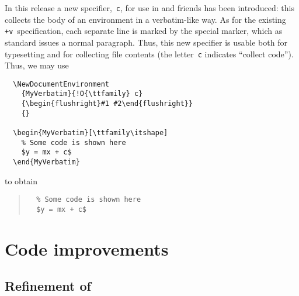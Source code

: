\documentclass{ltnews}
\begin{document}
In this release a new specifier,~\texttt{c},
for use
in  and friends
has been introduced: 
this collects the body of an environment in a verbatim-like way. 
As for the
existing \texttt{+v}~specification, each separate line is marked by
the special  marker, which as standard issues a normal
paragraph. Thus, this new specifier is usable both for typesetting and
for collecting file contents (the letter~\texttt{c} indicates
\enquote{collect code}). 
Thus, we may use
\begin{verbatim}
  \NewDocumentEnvironment
    {MyVerbatim}{!O{\ttfamily} c}
    {\begin{flushright}#1 #2\end{flushright}}
    {}
    
  \begin{MyVerbatim}[\ttfamily\itshape]
    % Some code is shown here
    $y = mx + c$
  \end{MyVerbatim}
\end{verbatim}
to obtain
\begin{quote}
\makeatletter
\def\@verbatim{%
  \trivlist
  \raggedleft
  \let \do \@makeother
  \dospecials
  \obeylines
  \normalfont \ttfamily \itshape
  \@noligs
}
\begin{verbatim}
  % Some code is shown here
  $y = mx + c$
\end{verbatim}
\end{quote}

\section{Code improvements}

\subsection{Refinement of }
\end{document}
